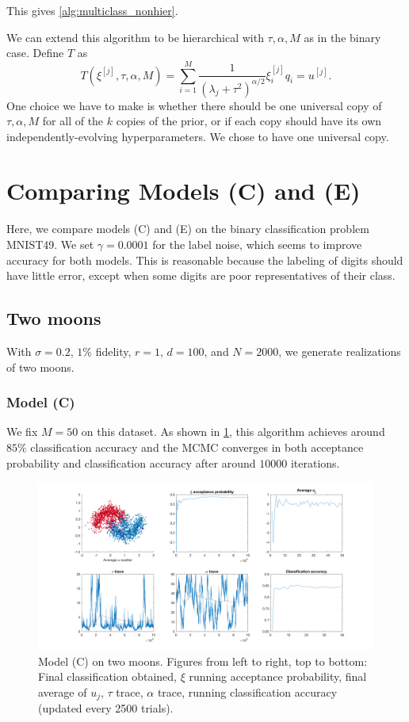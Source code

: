 \documentclass{siamart1116}
\begin{document}
        This gives \cref{alg:multiclass_nonhier}.

        We can extend this algorithm to be hierarchical with $\tau, \alpha, M$ as in the binary case. Define $T$ as
         \[T(\xi^{[j]}, \tau, \alpha, M) = \sum_{i=1}^M \frac{1}{(\lambda_j + \tau^2)^{\alpha/2}} \xi^{[j]}_i q_i = u^{[j]}.\]
         One choice we have to make is whether there should be one universal copy of $\tau, \alpha, M$ for all of the $k$ copies of the prior, or if each copy should have its own independently-evolving hyperparameters. We chose to have one universal copy.

\section{Comparing Models (C) and (E)}
    Here, we compare models (C) and (E) on the binary classification problem MNIST49. We set $\gamma = 0.0001$ for the label noise, which seems to improve accuracy for both models. This is reasonable because the labeling of digits should have little error, except when some digits are poor representatives of their class.
    
    \iffalse
    \subsection{Two moons}
        With $\sigma=0.2$, $1\%$ fidelity, $r=1$, $d=100$, and $N=2000$, we generate realizations of two moons.
        \subsubsection{Model (C)}
            We fix $M=50$ on this dataset. As shown in \cref{fig:model_c_two_moons}, this algorithm achieves around $85\%$ classification accuracy and the MCMC converges in both acceptance probability and classification accuracy after around $10000$ iterations.
            \begin{figure}[!htb]
                \centering
                \caption{\label{fig:model_c_two_moons}Model (C) on two moons. Figures from left to right, top to bottom: Final classification obtained, $\xi$ running acceptance probability, final average of $u_j$, $\tau$ trace, $\alpha$ trace, running classification accuracy (updated every 2500 trials).}
                \includegraphics[width=0.8\linewidth]{model_c_vs_model_e/moons/learn_t_a/all.png}
            \end{figure}
\end{document}
